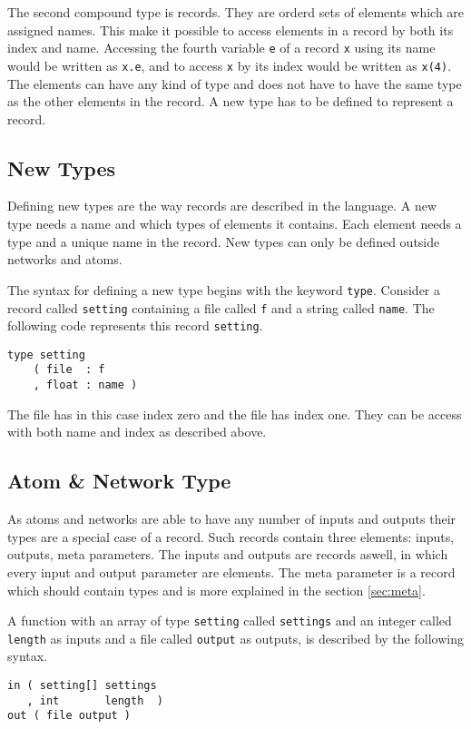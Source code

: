 The second compound type is records. They are orderd sets of elements
which are assigned names. This make it possible to access elements in
a record by both its index and name. Accessing the fourth variable
\verb#e# of a record \verb#x# using its name would be written as
\verb#x.e#, and to access \verb#x# by its index would be written as
\verb#x(4)#. The elements can have any kind of type and does not have
to have the same type as the other elements in the record. A new type
has to be defined to represent a record.

\subsection{New Types}
Defining new types are the way records are described in the
language. A new type needs a name and which types of elements it
contains. Each element needs a type and a unique name in the
record. New types can only be defined outside networks and atoms.

The syntax for defining a new type begins with the keyword
\verb#type#. Consider a record called \verb#setting# containing a file
called \verb#f# and a string called \verb#name#. The following code
represents this record \verb#setting#.

\begin{verbatim}
type setting
    ( file  : f
    , float : name )
\end{verbatim}

The file has in this case index zero and the file has index one. They
can be access with both name and index as described above.

\subsection{Atom \& Network Type}
As atoms and networks are able to have any number of inputs and
outputs their types are a special case of a record. Such records
contain three elements: inputs, outputs, meta parameters. The inputs
and outputs are records aswell, in which every input and output
parameter are elements. The meta parameter is a record which should
contain types and is more explained in the section \autoref{sec:meta}.

A function with an array of type \verb#setting# called \verb#settings#
and an integer called \verb#length# as inputs and a file called
\verb#output# as outputs, is described by the following syntax.

\begin{verbatim}
in ( setting[] settings
   , int       length  )
out ( file output )
\end{verbatim}

